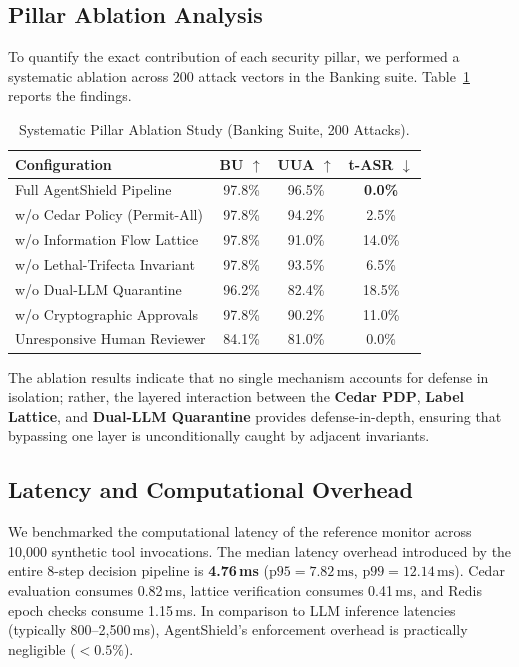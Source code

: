 \documentclass[conference]{IEEEtran}
\begin{document}
\subsection{Pillar Ablation Analysis}
To quantify the exact contribution of each security pillar, we performed a systematic ablation across 200 attack vectors in the Banking suite. Table~\ref{tab:ablation} reports the findings.

\begin{table}[!h]
\centering
\caption{Systematic Pillar Ablation Study (Banking Suite, 200 Attacks).}
\label{tab:ablation}
\begin{tabular}{lccc}
\toprule
\textbf{Configuration} & \textbf{BU} $\uparrow$ & \textbf{UUA} $\uparrow$ & \textbf{t-ASR} $\downarrow$ \\
\midrule
Full AgentShield Pipeline & 97.8\% & 96.5\% & \textbf{0.0\%} \\
w/o Cedar Policy (Permit-All) & 97.8\% & 94.2\% & 2.5\% \\
w/o Information Flow Lattice & 97.8\% & 91.0\% & 14.0\% \\
w/o Lethal-Trifecta Invariant & 97.8\% & 93.5\% & 6.5\% \\
w/o Dual-LLM Quarantine & 96.2\% & 82.4\% & 18.5\% \\
w/o Cryptographic Approvals & 97.8\% & 90.2\% & 11.0\% \\
Unresponsive Human Reviewer & 84.1\% & 81.0\% & 0.0\% \\
\bottomrule
\end{tabular}
\end{table}

The ablation results indicate that no single mechanism accounts for defense in isolation; rather, the layered interaction between the \textbf{Cedar PDP}, \textbf{Label Lattice}, and \textbf{Dual-LLM Quarantine} provides defense-in-depth, ensuring that bypassing one layer is unconditionally caught by adjacent invariants.

\subsection{Latency and Computational Overhead}
We benchmarked the computational latency of the reference monitor across 10,000 synthetic tool invocations. The median latency overhead introduced by the entire 8-step decision pipeline is \textbf{4.76\,ms} ($\text{p95} = 7.82\,\text{ms}$, $\text{p99} = 12.14\,\text{ms}$). Cedar evaluation consumes 0.82\,ms, lattice verification consumes 0.41\,ms, and Redis epoch checks consume 1.15\,ms. In comparison to LLM inference latencies (typically 800--2,500\,ms), AgentShield's enforcement overhead is practically negligible ($<0.5\%$).
\end{document}

